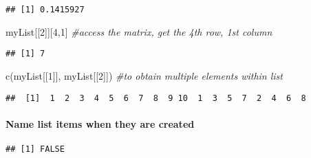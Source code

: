 \documentclass[
]{article}
\newenvironment{Shaded}{\begin{snugshade}}{\end{snugshade}}
\newcommand{\AttributeTok}[1]{\textcolor[rgb]{0.77,0.63,0.00}{#1}}
\newcommand{\CommentTok}[1]{\textcolor[rgb]{0.56,0.35,0.01}{\textit{#1}}}
\newcommand{\DecValTok}[1]{\textcolor[rgb]{0.00,0.00,0.81}{#1}}
\newcommand{\FunctionTok}[1]{\textcolor[rgb]{0.00,0.00,0.00}{#1}}
\newcommand{\NormalTok}[1]{#1}
\newcommand{\OtherTok}[1]{\textcolor[rgb]{0.56,0.35,0.01}{#1}}
\newcommand{\SpecialCharTok}[1]{\textcolor[rgb]{0.00,0.00,0.00}{#1}}
\begin{document}
\begin{verbatim}
## [1] 0.1415927
\end{verbatim}

\begin{Shaded}
\begin{Highlighting}[]
\NormalTok{myList[[}\DecValTok{2}\NormalTok{]][}\DecValTok{4}\NormalTok{,}\DecValTok{1}\NormalTok{] }\CommentTok{\#access the matrix, get the 4th row, 1st column}
\end{Highlighting}
\end{Shaded}

\begin{verbatim}
## [1] 7
\end{verbatim}

\begin{Shaded}
\begin{Highlighting}[]
\FunctionTok{c}\NormalTok{(myList[[}\DecValTok{1}\NormalTok{]], myList[[}\DecValTok{2}\NormalTok{]]) }\CommentTok{\#to obtain multiple elements within list}
\end{Highlighting}
\end{Shaded}

\begin{verbatim}
##  [1]  1  2  3  4  5  6  7  8  9 10  1  3  5  7  2  4  6  8
\end{verbatim}

\hypertarget{name-list-items-when-they-are-created}{%
\paragraph{Name list items when they are
created}\label{name-list-items-when-they-are-created}}

\begin{Shaded}
\end{Shaded}

\begin{verbatim}
## [1] FALSE
\end{verbatim}

\begin{Shaded}
\end{Shaded}
\end{document}

